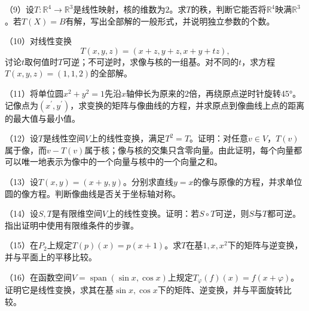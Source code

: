 \begin{exercise}
（9）设\(T : \mathbb{R}^{4} \longrightarrow \mathbb{R}^{3}\)是线性映射，核的维数为\(2\)。求\(T\)的秩，判断它能否将\(\mathbb{R}^{4}\)映满\(\mathbb{R}^{3}\)。若\(T \left( X \right) = B\)有解，写出全部解的一般形式，并说明独立参数的个数。

（10）对线性变换
\begin{equation*}
    T \left( x , y , z \right) = \left( x + z , y + z , x + y + t z \right) ,
\end{equation*}
讨论\(t\)取何值时\(T\)可逆；不可逆时，求像与核的一组基。对不同的\(t\)，求方程\(T \left( x , y , z \right) = \left( 1 , 1 , 2 \right)\)的全部解。

（11）将单位圆\(x^{2} + y^{2} = 1\)先沿\(x\)轴伸长为原来的\(2\)倍，再绕原点逆时针旋转45°。记像点为\(\left( x^{\prime} , y^{\prime} \right)\)，求变换的矩阵与像曲线的方程，并求原点到像曲线上点的距离的最大值与最小值。

（12）设\(T\)是线性空间\(V\)上的线性变换，满足\(T^{2} = T\)。证明：对任意\(v \in V\)，\(T \left( v \right)\)属于像，而\(v - T \left( v \right)\)属于核；像与核的交集只含零向量。由此证明，每个向量都可以唯一地表示为像中的一个向量与核中的一个向量之和。

（13）设\(T \left( x , y \right) = \left( x + y , y \right)\)。分别求直线\(y = x\)的像与原像的方程，并求单位圆的像方程。判断像曲线是否关于坐标轴对称。

（14）设\(S , T\)是有限维空间\(V\)上的线性变换。证明：若\(S \circ T\)可逆，则\(S\)与\(T\)都可逆。指出证明中使用有限维条件的步骤。

（15）在\(P_{2}\)上规定\(T \left( p \right) \left( x \right) = p \left( x + 1 \right)\)。求\(T\)在基\(1 , x , x^{2}\)下的矩阵与逆变换，并与平面上的平移比较。

（16）在函数空间\(V = \operatorname{span}\left( \sin x , \cos x \right)\)上规定\(T_{\varphi} \left( f \right) \left( x \right) = f \left( x + \varphi \right)\)。证明它是线性变换，求其在基\(\sin x , \cos x\)下的矩阵、逆变换，并与平面旋转比较。
\end{exercise}
\newpage
